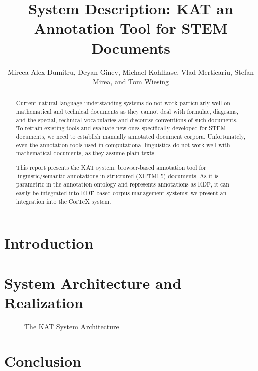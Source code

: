 \documentclass{llncs}
\title{System Description: KAT an Annotation Tool for STEM Documents}
\author{Mircea Alex Dumitru, Deyan Ginev, Michael  Kohlhase, Vlad Merticariu, Stefan
  Mirea, and Tom Wiesing}
\institute{
  Computer Science\\ Jacobs University Bremen\\
  \url{http://kwarc.info}
}
\def\sys{\textsf{KAT}\xspace}
\def\KAT{\textsf{KAT}\xspace}
\begin{document}
\maketitle
\begin{abstract}
  Current natural language understanding systems do not work particularly well on
  mathematical and technical documents as they cannot deal with formulae, diagrams, and
  the special, technical vocabularies and discourse conventions of such documents. To
  retrain existing tools and evaluate new ones specifically developed for STEM documents,
  we need to establish manually annotated document corpora. Unfortunately, even the
  annotation tools used in computational linguistics do not work well with mathematical
  documents, as they assume plain texts.

  This report presents the \sys system, browser-based annotation tool for
  linguistic/semantic annotations in structured (XHTML5) documents. As it is parametric in
  the annotation ontology and represents annotations as RDF, it can easily be integrated
  into RDF-based corpus management systems; we present an integration into the CorTeX
  system.
\end{abstract}

\section{Introduction}\label{sec:intro}


\section{System Architecture and Realization}\label{sec:arch}
\begin{figure}[ht]\centering
\def\localxscale{.8}\def\localyscale{1.1}

\caption{The \KAT System Architecture}\label{fig:kat-arch}
\end{figure}

\section{Conclusion}\label{sec:concl}



\printbibliography
\end{document}
